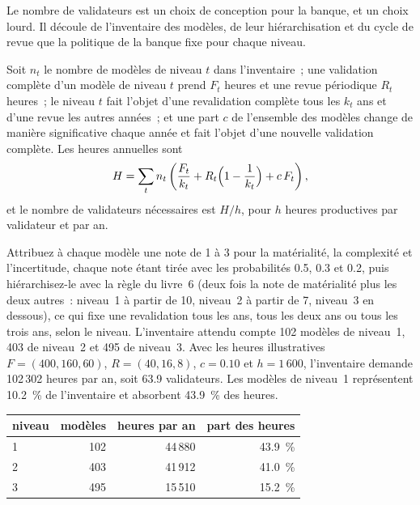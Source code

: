 Le nombre de validateurs est un choix de conception pour la banque, et un choix lourd. Il découle de l'inventaire des modèles, de leur
hiérarchisation et du cycle de revue que la politique de la banque fixe pour chaque niveau.

\begin{method}\label{met:in:bank-quant:workload}
Soit $n_t$ le nombre de modèles de niveau $t$ dans l'inventaire~; une validation complète d'un modèle de niveau $t$ prend $F_t$ heures et une revue périodique
$R_t$ heures~; le niveau $t$ fait l'objet d'une revalidation complète tous les $k_t$ ans et d'une revue les autres années~; et une part $c$ de l'ensemble des modèles
change de manière significative chaque année et fait l'objet d'une nouvelle validation complète. Les heures annuelles sont
\[
H=\sum_t n_t\left(\frac{F_t}{k_t}+R_t\Bigl(1-\frac{1}{k_t}\Bigr)+c\,F_t\right),
\]
et le nombre de validateurs nécessaires est $H/h$, pour $h$ heures productives par validateur et par an.
\end{method}

\begin{example}\label{ex:in:bank-quant:inventory}
Attribuez à chaque modèle une note de 1 à 3 pour la matérialité, la complexité et l'incertitude, chaque note étant tirée avec les probabilités 0.5, 0.3 et
0.2, puis hiérarchisez-le avec la règle du livre~6 (deux fois la note de matérialité plus les deux autres~: niveau~1 à partir de 10, niveau~2 à partir de 7, niveau~3 en dessous), ce qui fixe
une revalidation tous les ans, tous les deux ans ou tous les trois ans, selon le niveau. L'inventaire attendu compte 102 modèles de niveau~1, 403 de niveau~2 et 495 de niveau~3.
Avec les heures illustratives $F=(400,160,60)$, $R=(40,16,8)$, $c=0.10$ et $h=1\,600$, l'inventaire demande
102\,302 heures par an, soit 63.9 validateurs. Les modèles de niveau~1 représentent 10.2~\% de l'inventaire et absorbent 43.9~\% des heures.
\end{example}

\begin{center}\footnotesize
\begin{tabular}{@{}lrrr@{}}
\toprule
niveau & modèles & heures par an & part des heures\\
\midrule
1 & 102 & 44\,880 & 43.9~\%\\
2 & 403 & 41\,912 & 41.0~\%\\
3 & 495 & 15\,510 & 15.2~\%\\
\bottomrule
\end{tabular}
\end{center}


